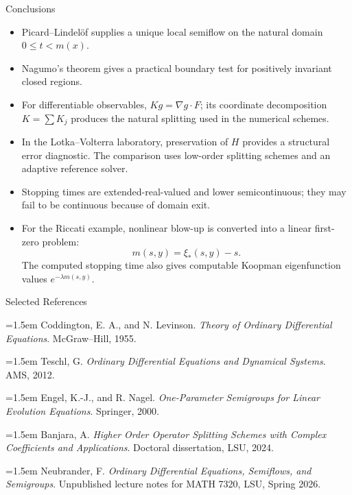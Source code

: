 \documentclass[aspectratio=169,11pt]{beamer}
\begin{document}
\begin{frame}{Conclusions}
\small
\begin{itemize}
  \item Picard--Lindel\"of supplies a unique local semiflow on the natural domain \(0\le t<m(x)\).
  \item Nagumo's theorem gives a practical boundary test for positively invariant closed regions.
  \item For differentiable observables, \(Kg=\nabla g\cdot F\); its coordinate decomposition \(K=\sum K_j\) produces the natural splitting used in the numerical schemes.
  \item In the Lotka--Volterra laboratory, preservation of \(H\) provides a structural error diagnostic. The comparison uses low-order splitting schemes and an adaptive reference solver.
  \item Stopping times are extended-real-valued and lower semicontinuous; they may fail to be continuous because of domain exit.
  \item For the Riccati example, nonlinear blow-up is converted into a linear first-zero problem:
  \[
  \boxed{m(s,y)=\xi_*(s,y)-s.}
  \]
  The computed stopping time also gives computable Koopman eigenfunction values \(e^{-\lambda m(s,y)}\).
\end{itemize}
\end{frame}

\begin{frame}{Selected References}
\footnotesize
\setlength{\parindent}{0pt}
\setlength{\parskip}{0.42em}

\hangindent=1.5em
Coddington, E. A., and N. Levinson. \emph{Theory of Ordinary Differential Equations}. McGraw--Hill, 1955.

\hangindent=1.5em
Teschl, G. \emph{Ordinary Differential Equations and Dynamical Systems}. AMS, 2012.

\hangindent=1.5em
Engel, K.-J., and R. Nagel. \emph{One-Parameter Semigroups for Linear Evolution Equations}. Springer, 2000.

\hangindent=1.5em
Banjara, A. \emph{Higher Order Operator Splitting Schemes with Complex Coefficients and Applications}. Doctoral dissertation, LSU, 2024.

\hangindent=1.5em
Neubrander, F. \emph{Ordinary Differential Equations, Semiflows, and Semigroups}. Unpublished lecture notes for MATH 7320, LSU, Spring 2026.
\end{frame}
\end{document}
